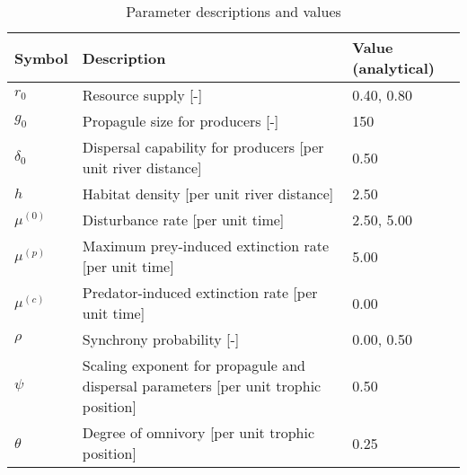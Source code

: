 \begin{table}[ht]
\centering
\caption{Parameter descriptions and values\label{tab:parms}} 
\begingroup\small
\begin{tabularx}{\textwidth}{lll}
  \hline
Symbol & Description & Value (analytical) \\ 
  \hline
$r_0$ & Resource supply [-] & 0.40, 0.80 \\ 
  $g_0$ & Propagule size for producers [-] & 150 \\ 
  $\delta_0$ & Dispersal capability for producers [per unit river distance] & 0.50 \\ 
  $h$ & Habitat density [per unit river distance] & 2.50 \\ 
  $\mu^{(0)}$ & Disturbance rate [per unit time] & 2.50, 5.00 \\ 
  $\mu^{(p)}$ & Maximum prey-induced extinction rate [per unit time] & 5.00 \\ 
  $\mu^{(c)}$ & Predator-induced extinction rate [per unit time] & 0.00 \\ 
  $\rho$ & Synchrony probability [-] & 0.00, 0.50 \\ 
  $\psi$ & Scaling exponent for propagule and dispersal parameters [per unit trophic position] & 0.50 \\ 
  $\theta$ & Degree of omnivory [per unit trophic position] & 0.25 \\ 
   \hline
\end{tabularx}
\endgroup
\end{table}
